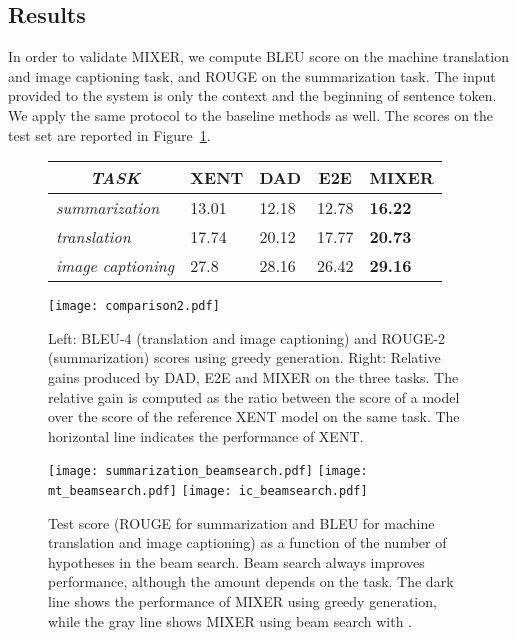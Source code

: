 \documentclass{article} \usepackage{iclr2016_conference,times}
\begin{document}
\subsection{Results}
In order to validate MIXER, we compute BLEU score on the machine translation and image captioning task, and ROUGE on the summarization task. 
The input provided to the system is only the context and the beginning of sentence token. We apply the same protocol to the baseline methods as well. The scores on the test set are reported in Figure~\ref{fig:gain}. \begin{figure}[!t]
\centering
\begin{minipage}[c][][c]{.4\textwidth}
\centering
\begin{tabular}{l || l | l | l |l}
\multicolumn{1}{c||}{\emph{TASK} }  & 
      \multicolumn{1}{c|}{XENT} &
      \multicolumn{1}{c|}{DAD} & \multicolumn{1}{c|}{E2E} & \multicolumn{1}{c}{MIXER}\\
      \hline
      \hline
      {\em summarization} & 13.01 & 12.18 & 12.78 &  \bf{16.22} \\
      \hline
      {\em translation} & 17.74 & 20.12 & 17.77 & {\bf 20.73} \\
      \hline
      {\em image captioning} & 27.8 & 28.16 & 26.42 & \bf{29.16} \\
    \end{tabular}
\end{minipage}\hfill
\begin{minipage}[c][][c]{.4\textwidth}
\centering
\texttt{[image: comparison2.pdf]}
\vspace{-.30cm}
\caption{Left: BLEU-4 (translation and image captioning) and ROUGE-2 (summarization) scores using greedy generation. Right: Relative gains
  produced by DAD, E2E and MIXER on the three tasks. 
  The relative gain is computed as the ratio between the score of a model over the score of the reference XENT model on the same task. The horizontal line indicates the performance of XENT.}
\label{fig:gain}
\end{minipage}
\end{figure}
\begin{figure}[!t]
\begin{center}
\texttt{[image: summarization\_beamsearch.pdf]}
 \hspace{-.6cm}
 \texttt{[image: mt\_beamsearch.pdf]}
 \hspace{-.6cm}
  \texttt{[image: ic\_beamsearch.pdf]}
\end{center}
\vspace{-.2cm}
\caption{Test score (ROUGE for summarization and BLEU for machine translation and image captioning) as a function of the number of hypotheses  in the beam search. Beam search always improves performance, although the amount depends on the task. The dark line shows the performance of MIXER using greedy generation, while the gray line shows MIXER using beam search with .}
\label{fig:beam_search}
\end{figure}
\end{document}
